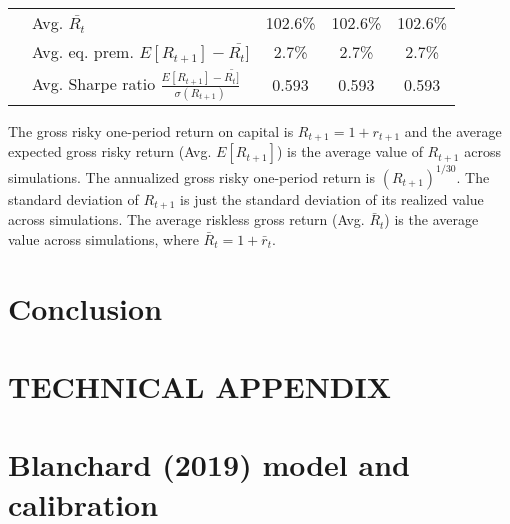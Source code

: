 \documentclass[letterpaper,12pt]{article}
\theoremstyle{definition}
\begin{document}
\begin{spacing}{1.5}
\begin{table}[htbp]
\begin{threeparttable}
\begin{tabular}{>{\small}l| >{\small}l| >{\small}c| >{\small}c| >{\small}c}
      & \quad Avg. $\bar{R_t}$ & 102.6\% & 102.6\% & 102.6\% \\
      & \quad Avg. eq. prem. $E[R_{t+1}] - \bar{R_t]}$ & 2.7\% & 2.7\% & 2.7\% \\
      & \quad Avg. Sharpe ratio $\frac{E[R_{t+1}] - \bar{R_t]}}{\sigma(R_{t+1})}$ & 0.593 & 0.593 & 0.593 \\
      \hline\hline
    \end{tabular}
    \begin{tablenotes}
      \scriptsize{\item[]The gross risky one-period return on capital is $R_{t+1} = 1 + r_{t+1}$ and the average expected gross risky return (Avg. $E[R_{t+1}]$) is the average value of $R_{t+1}$ across simulations. The annualized gross risky one-period return is $(R_{t+1})^{1/30}$. The standard deviation of $R_{t+1}$ is just the standard deviation of its realized value across simulations. The average riskless gross return (Avg. $\bar{R}_t$) is the average value across simulations, where $\bar{R}_t=1+\bar{r}_t$.}
    \end{tablenotes}
    \end{threeparttable}
  \end{table}

  \clearpage


\section{Conclusion}\label{SecConclusion}


\end{spacing}




\newpage
\renewcommand{\theequation}{T.\arabic{section}.\arabic{equation}}
\renewcommand{\thesection}{T-\arabic{section}}   %

\setcounter{equation}{0}                         %
\setcounter{section}{0}                          %
\section*{TECHNICAL APPENDIX}


\setcounter{equation}{0}                         %
\section{Blanchard (2019) model and calibration}\label{SecTAppBlanch}
\end{document}
